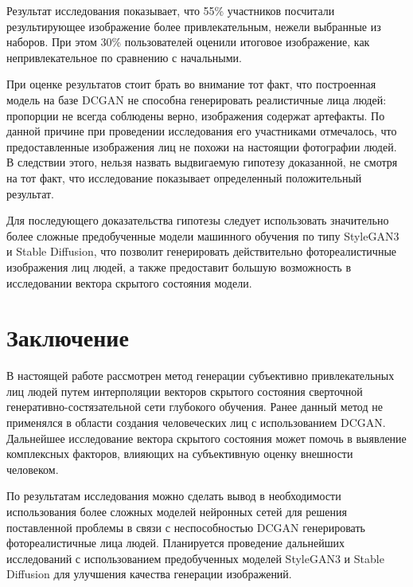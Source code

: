 \documentclass[60x84/16,8pt]{ittmm}
\begin{document}
Результат исследования показывает, что 55\% участников посчитали результирующее
изображение более привлекательным, нежели выбранные из наборов.
При этом 30\% пользователей оценили итоговое изображение, как
непривлекательное по сравнению с начальными.

При оценке результатов стоит брать во внимание тот факт, что
построенная модель на базе DCGAN не способна генерировать
реалистичные лица людей: пропорции не всегда соблюдены верно,
изображения содержат артефакты. По данной причине при проведении
исследования его участниками отмечалось, что предоставленные изображения
лиц не похожи на настоящии фотографии людей. В следствии этого,
нельзя назвать выдвигаемую гипотезу доказанной, не смотря на тот факт,
что исследование показывает определенный положительный результат.

Для последующего доказательства гипотезы следует использовать
значительно более сложные предобученные модели машинного обучения
по типу StyleGAN3 \cite{stylegan} и Stable Diffusion, что позволит генерировать
действительно фотореалистичные изображения лиц людей, а также
предоставит большую возможность в исследовании вектора скрытого
состояния модели.

\section{Заключение}

В настоящей работе рассмотрен метод генерации субъективно привлекательных лиц людей
путем интерполяции векторов скрытого состояния сверточной
генеративно-состязательной сети глубокого обучения. Ранее данный
метод не применялся в области создания человеческих лиц с
использованием DCGAN. Дальнейшее исследование вектора скрытого состояния
может помочь в выявление комплексных факторов, влияющих на субъективную
оценку внешности человеком.

По результатам исследования можно сделать вывод в необходимости
использования более сложных моделей нейронных сетей для решения
поставленной проблемы в связи с неспособностью DCGAN генерировать
фотореалистичные лица людей. Планируется проведение дальнейших исследований
с использованием предобученных моделей StyleGAN3 и Stable Diffusion
для улучшения качества генерации изображений.
\end{document}
